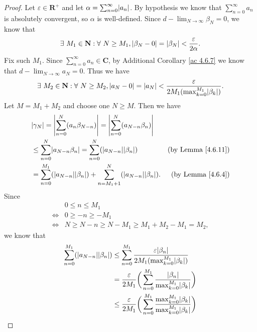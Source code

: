 \begin{proof}
    Let \(\varepsilon \in \mathbf{R}^+\) and let \(\alpha = \sum_{n = 0}^\infty \abs*{a_n}\).
    By hypothesis we know that \(\sum_{n = 0}^\infty a_n\) is absolutely convergent, so \(\alpha\) is well-defined.
    Since \(d - \lim_{N \to \infty} \beta_N = 0\), we know that
    \[
        \exists\ M_1 \in \mathbf{N} : \forall\ N \geq M_1, \abs*{\beta_N - 0} = \abs*{\beta_N} < \frac{\varepsilon}{2 \alpha}.
    \]
    Fix such \(M_1\).
    Since \(\sum_{n = 0}^\infty a_n \in \mathbf{C}\), by Additional Corollary \ref{ac 4.6.7} we know that \(d - \lim_{N \to \infty} a_N = 0\).
    Thus we have
    \[
        \exists\ M_2 \in \mathbf{N} : \forall\ N \geq M_2, \abs*{a_N - 0} = \abs*{a_N} < \frac{\varepsilon}{2 M_1 (\max_{k = 0}^{M_1} \abs*{\beta_k})}.
    \]
    Let \(M = M_1 + M_2\) and choose one \(N \geq M\).
    Then we have
    \begin{align*}
         & \abs*{\gamma_N} = \abs*{\sum_{n = 0}^N (a_n \beta_{N - n})} = \abs*{\sum_{n = 0}^N (a_{N - n} \beta_n)}                                           \\
         & \leq \sum_{n = 0}^N \abs*{a_{N - n} \beta_n} = \sum_{n = 0}^N (\abs*{a_{N - n}} \abs*{\beta_n})                  & \text{(by Lemma \ref{4.6.11})} \\
         & = \sum_{n = 0}^{M_1} (\abs*{a_{N - n}} \abs*{\beta_n}) + \sum_{n = M_1 + 1}^N (\abs*{a_{N - n}} \abs*{\beta_n}). & \text{(by Lemma \ref{4.6.4})}
    \end{align*}
    Since
    \begin{align*}
             & 0 \leq n \leq M_1                                     \\
        \iff & 0 \geq -n \geq -M_1                                   \\
        \iff & N \geq N - n \geq N - M_1 \geq M_1 + M_2 - M_1 = M_2,
    \end{align*}
    we know that
    \begin{align*}
        \sum_{n = 0}^{M_1} (\abs*{a_{N - n}} \abs*{\beta_n}) & \leq \sum_{n = 0}^{M_1} \frac{\varepsilon \abs*{\beta_n}}{2 M_1 (\max_{k = 0}^{M_1} \abs*{\beta_k})}                                      \\
                                                             & = \frac{\varepsilon}{2 M_1} \bigg(\sum_{n = 0}^{M_1} \frac{\abs*{\beta_n}}{\max_{k = 0}^{M_1} \abs*{\beta_k}}\bigg)                       \\
                                                             & \leq \frac{\varepsilon}{2 M_1} \bigg(\sum_{n = 0}^{M_1} \frac{\max_{k = 0}^{M_1} \abs*{\beta_k}}{\max_{k = 0}^{M_1} \abs*{\beta_k}}\bigg) \\

\end{align*}
\end{proof}
